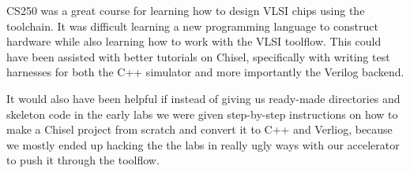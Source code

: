 \documentclass[twocolumn]{article}
\begin{document}
CS250 was a great course for learning how to design VLSI chips using the
toolchain. It was difficult learning a new programming language to construct
hardware while also learning how to work with the VLSI toolflow. This could have 
been assisted with better tutorials on Chisel, specifically with writing test harnesses
for both the C++ simulator and more importantly the Verilog backend. 

It would also have been helpful if instead of giving us ready-made directories and skeleton
code in the early labs we were given step-by-step instructions on how to make a Chisel project
from scratch and convert it to C++ and Verliog, because we mostly ended up hacking the the labs
in really ugly ways with our accelerator to push it through the toolflow. 



\end{document}
